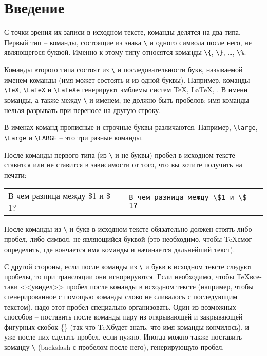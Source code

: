 \part{Введение}

С точки зрения их записи в исходном тексте, команды делятся на два типа. Первый тип -- команды, состоящие из знака \verb"\" и одного символа после него, не являющегося буквой. Именно к этому типу относятся команды \verb"\{", \verb"\}", \dots , \verb"\%".

Команды второго типа состоят из \verb"\" и последовательности букв, называемой именем команды (имя может состоять и из одной буквы). Например, команды \verb"\TeX", \verb"\LaTeX" и \verb"\LaTeXe" генерируют эмблемы систем \TeX, \LaTeX, \LaTeXe. В имени команды, а также между \verb"\" и именем, не должно быть пробелов; имя команды нельзя разрывать при переносе на другую строку.

В именах команд прописные и строчные буквы различаются. Например, \verb"\large", \verb"\Large" и \verb"\LARGE" -- это три разные команды.

После команды первого типа (из \verb"\" и не-буквы) пробел в исходном тексте ставится или не ставится в зависимости от того, что вы хотите получить на печати:

\quad
\begin{tabular}{ll}
	В чем разница между \$1 и \$ 1?&\verb"В чем разница между \$1 и \$ 1?"\\
\end{tabular}
\quad

После команды из \verb"\" и букв в исходном тексте обязательно должен стоять либо пробел, либо символ, не являющийся буквой (это необходимо, чтобы \TeX смог определить, где кончается имя команды и начинается дальнейший текст).

С другой стороны, если после команды из \verb"\" и букв в исходном тексте следуют пробелы, то при трансляции они игнорируются. Если необходимо, чтобы \TeX все-таки <<увидел>> пробел после команды в исходном тексте (например, чтобы сгенерированное с помощью команды слово не сливалось с последующим текстом), надо этот пробел специально организовать. Один из возможных способов -- поставить после команды пару из открывающей и закрывающей фигурных скобок \{\} (так что \TeX будет знать, что имя команды кончилось), и уже после них сделать пробел, если нужно. Иногда можно также поставить команду \verb"\" (backslash с пробелом после него), генерирующую пробел.
